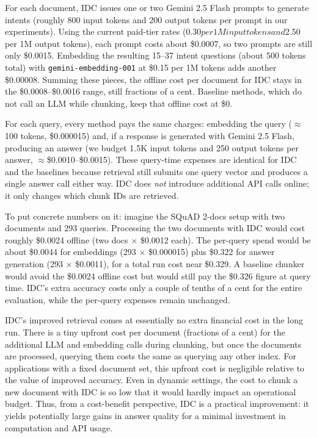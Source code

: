 \documentclass[12pt,a4paper]{report}
\begin{document}
For each document, IDC issues one or two Gemini 2.5 Flash prompts to generate intents (roughly 800 input tokens and 200 output tokens per prompt in our experiments). Using the current paid-tier rates ($0.30 per 1M input tokens and $2.50 per 1M output tokens), each prompt costs about \$0.0007, so two prompts are still only \$0.0015. Embedding the resulting 15--37 intent questions (about 500 tokens total) with \texttt{gemini-embedding-001} at \$0.15 per 1M tokens adds another \$0.00008. Summing these pieces, the offline cost per document for IDC stays in the \$0.0008--\$0.0016 range, still fractions of a cent. Baseline methods, which do not call an LLM while chunking, keep that offline cost at \$0.

For each query, every method pays the same charges: embedding the query ($\approx$100 tokens, \$0.000015) and, if a response is generated with Gemini 2.5 Flash, producing an answer (we budget 1.5K input tokens and 250 output tokens per answer, $\approx$\$0.0010--\$0.0015). These query-time expenses are identical for IDC and the baselines because retrieval still submits one query vector and produces a single answer call either way. IDC does \textit{not} introduce additional API calls online; it only changes which chunk IDs are retrieved.

To put concrete numbers on it: imagine the SQuAD 2-docs setup with two documents and 293 queries. Processing the two documents with IDC would cost roughly \$0.0024 offline (two docs $\times$ \$0.0012 each). The per-query spend would be about \$0.0044 for embeddings (293 $\times$ \$0.000015) plus \$0.322 for answer generation (293 $\times$ \$0.0011), for a total run cost near \$0.329. A baseline chunker would avoid the \$0.0024 offline cost but would still pay the \$0.326 figure at query time. IDC's extra accuracy costs only a couple of tenths of a cent for the entire evaluation, while the per-query expenses remain unchanged.

IDC's improved retrieval comes at essentially no extra financial cost in the long run. There is a tiny upfront cost per document (fractions of a cent) for the additional LLM and embedding calls during chunking, but once the documents are processed, querying them costs the same as querying any other index. For applications with a fixed document set, this upfront cost is negligible relative to the value of improved accuracy. Even in dynamic settings, the cost to chunk a new document with IDC is so low that it would hardly impact an operational budget. Thus, from a cost-benefit perspective, IDC is a practical improvement: it yields potentially large gains in answer quality for a minimal investment in computation and API usage.
\end{document}

